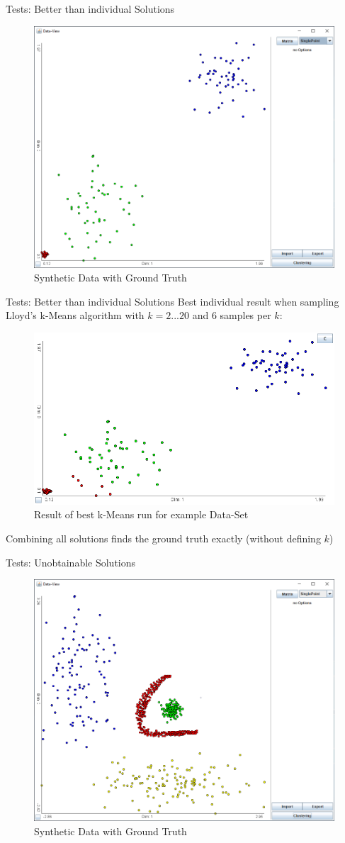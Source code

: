 \documentclass[aspectratio=169]{beamer}
\begin{document}
\begin{frame}{Tests: Better than individual Solutions}
	\begin{figure}[h]
		\centering
		\includegraphics[width=.64\textwidth]{better_base}
		\caption{Synthetic Data with Ground Truth}
		\label{fig:better_base}
	\end{figure}
\end{frame}

\begin{frame}{Tests: Better than individual Solutions}
Best individual result when sampling Lloyd's k-Means algorithm with \newline $k=2...20$ and $6$ samples per $k$:
	\begin{figure}[h]
		\centering
		\includegraphics[width=.64\textwidth]{better_base_best}
		\caption{Result of best k-Means run for example Data-Set}
		\label{fig:better_base_best}
	\end{figure}
Combining all solutions finds the ground truth exactly (without defining $k$)
\end{frame}

\begin{frame}{Tests: Unobtainable Solutions}
	\begin{figure}[h]
		\centering
		\includegraphics[width=.64\textwidth]{unob}
		\caption{Synthetic Data with Ground Truth}
		\label{fig:better_base}
	\end{figure}
\end{frame}
\end{document}
